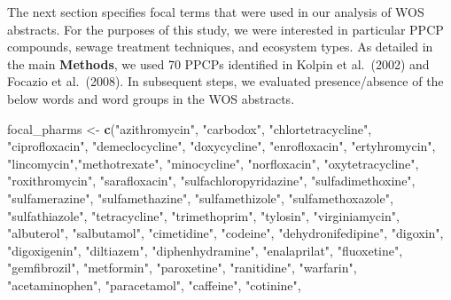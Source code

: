\documentclass[
]{article}
\newenvironment{Shaded}{\begin{snugshade}}{\end{snugshade}}
\newcommand{\KeywordTok}[1]{\textcolor[rgb]{0.13,0.29,0.53}{\textbf{#1}}}
\newcommand{\NormalTok}[1]{#1}
\newcommand{\StringTok}[1]{\textcolor[rgb]{0.31,0.60,0.02}{#1}}
\begin{document}
The next section specifies focal terms that were used in our analysis of
WOS abstracts. For the purposes of this study, we were interested in
particular PPCP compounds, sewage treatment techniques, and ecosystem
types. As detailed in the main \textbf{Methods}, we used 70 PPCPs
identified in Kolpin et al.~(2002) and Focazio et al.~(2008). In
subsequent steps, we evaluated presence/absence of the below words and
word groups in the WOS abstracts.

\begin{Shaded}
\begin{Highlighting}[]
\NormalTok{focal_pharms <-}\StringTok{ }\KeywordTok{c}\NormalTok{(}\StringTok{"azithromycin"}\NormalTok{, }\StringTok{"carbodox"}\NormalTok{, }\StringTok{"chlortetracycline"}\NormalTok{, }\StringTok{"ciprofloxacin"}\NormalTok{, }
                  \StringTok{"demeclocycline"}\NormalTok{, }\StringTok{"doxycycline"}\NormalTok{, }\StringTok{"enrofloxacin"}\NormalTok{, }\StringTok{"ertyhromycin"}\NormalTok{, }
                  \StringTok{"lincomycin"}\NormalTok{,}\StringTok{"methotrexate"}\NormalTok{, }\StringTok{"minocycline"}\NormalTok{, }\StringTok{"norfloxacin"}\NormalTok{, }
                  \StringTok{"oxytetracycline"}\NormalTok{, }\StringTok{"roxithromycin"}\NormalTok{, }\StringTok{"sarafloxacin"}\NormalTok{, }
                  \StringTok{"sulfachloropyridazine"}\NormalTok{, }\StringTok{"sulfadimethoxine"}\NormalTok{, }\StringTok{"sulfamerazine"}\NormalTok{,}
                 \StringTok{"sulfamethazine"}\NormalTok{, }\StringTok{"sulfamethizole"}\NormalTok{, }\StringTok{"sulfamethoxazole"}\NormalTok{, }
                 \StringTok{"sulfathiazole"}\NormalTok{, }\StringTok{"tetracycline"}\NormalTok{, }\StringTok{"trimethoprim"}\NormalTok{, }\StringTok{"tylosin"}\NormalTok{, }
                 \StringTok{"virginiamycin"}\NormalTok{, }\StringTok{"albuterol"}\NormalTok{, }\StringTok{"salbutamol"}\NormalTok{, }\StringTok{"cimetidine"}\NormalTok{, }\StringTok{"codeine"}\NormalTok{, }
                 \StringTok{"dehydronifedipine"}\NormalTok{, }\StringTok{"digoxin"}\NormalTok{, }\StringTok{"digoxigenin"}\NormalTok{, }\StringTok{"diltiazem"}\NormalTok{, }
                 \StringTok{"diphenhydramine"}\NormalTok{, }\StringTok{"enalaprilat"}\NormalTok{, }\StringTok{"fluoxetine"}\NormalTok{, }\StringTok{"gemfibrozil"}\NormalTok{, }
                 \StringTok{"metformin"}\NormalTok{, }\StringTok{"paroxetine"}\NormalTok{, }\StringTok{"ranitidine"}\NormalTok{, }\StringTok{"warfarin"}\NormalTok{,}
                 \StringTok{"acetaminophen"}\NormalTok{, }\StringTok{"paracetamol"}\NormalTok{, }\StringTok{"caffeine"}\NormalTok{, }\StringTok{"cotinine"}\NormalTok{, }

\end{Highlighting}
\end{Shaded}
\end{document}
